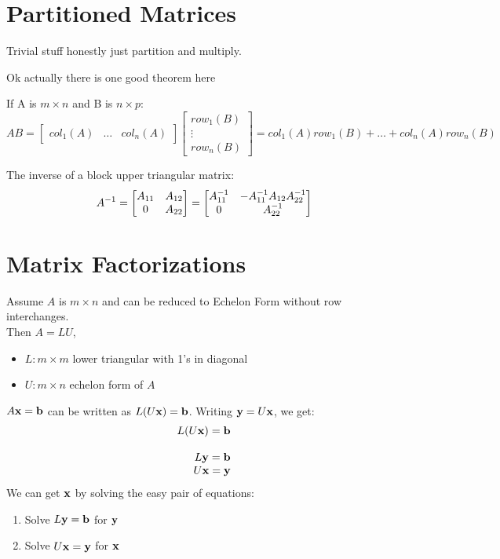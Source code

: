 \documentclass{report}
\begin{document}
\section{Partitioned Matrices}

Trivial stuff honestly just partition and multiply.

Ok actually there is one good theorem here
\begin{theorem}\end{theorem}
If A is $m \times n$ and B is $n \times p$:
\[
AB = \begin{bmatrix}col_1(A) & \ldots & col_n(A)\end{bmatrix} \begin{bmatrix}row_1(B) \\ \vdots \\ row_n(B)\end{bmatrix} = col_1(A) row_1(B) + \ldots + col_n(A) row_n(B)
\]

The inverse of a block upper triangular matrix:
\[
A^{-1} = \begin{bmatrix}
    A_{11} & A_{12} \\
    0 & A_{22}
\end{bmatrix} = \begin{bmatrix}
    A_{11}^{-1} & -A_{11}^{-1}A_{12}A_{22}^{-1} \\
    0 & A_{22}^{-1}
\end{bmatrix}
\]

\section{Matrix Factorizations}

Assume $A$ is $m \times n$ and can be reduced to Echelon Form without row interchanges. \\
Then $A = LU$,
\begin{itemize}
    \item $L: m \times m$ lower triangular with 1's in diagonal
    \item $U: m \times n$ echelon form of $A$
\end{itemize}

$A\mathbf{x} = \mathbf{b}$ can be written as $L(U\mathbf{x}) = \mathbf{b}$. Writing $\mathbf{y} = U\mathbf{x}$, we get:
\[
\begin{array}{rlr}
    L(U\mathbf{x}) = \mathbf{b} \\\\
    L\mathbf{y} = \mathbf{b} \\
    U\mathbf{x} = \mathbf{y}
\end{array}
\]
We can get $\mathbf{x}$ by solving the easy pair of equations:
\begin{enumerate}
    \item Solve $L\mathbf{y} = \mathbf{b}$ for $\mathbf{y}$
    \item Solve $U\mathbf{x} = \mathbf{y}$ for $\mathbf{x}$
\end{enumerate}
\end{document}
